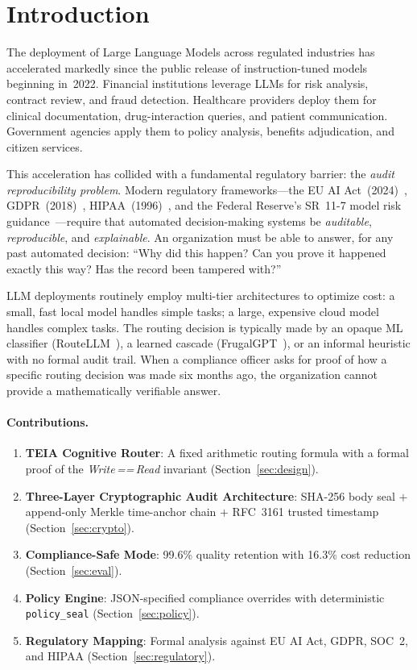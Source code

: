 \documentclass[11pt,a4paper]{article}
\newcommand{\teia}{\textsc{TEIA}}
\newcommand{\wwr}{\emph{Write\,==\,Read}}
\begin{document}
\tableofcontents
\newpage

\section{Introduction}

The deployment of Large Language Models across regulated industries has accelerated
markedly since the public release of instruction-tuned models beginning in~2022.
Financial institutions leverage LLMs for risk analysis, contract review, and fraud
detection. Healthcare providers deploy them for clinical documentation,
drug-interaction queries, and patient communication. Government agencies apply them
to policy analysis, benefits adjudication, and citizen services.

This acceleration has collided with a fundamental regulatory barrier: the
\emph{audit reproducibility problem}. Modern regulatory frameworks---the EU AI
Act~(2024)~\cite{euaiact}, GDPR~(2018)~\cite{gdpr}, HIPAA~(1996)~\cite{hipaa},
and the Federal Reserve's SR~11-7 model risk guidance~\cite{sr117}---require that
automated decision-making systems be \emph{auditable}, \emph{reproducible}, and
\emph{explainable}. An organization must be able to answer, for any past automated
decision: ``Why did this happen? Can you prove it happened exactly this way? Has
the record been tampered with?''

LLM deployments routinely employ multi-tier architectures to optimize cost: a
small, fast local model handles simple tasks; a large, expensive cloud model handles
complex tasks. The routing decision is typically made by an opaque ML classifier
(RouteLLM~\cite{routellm}), a learned cascade (FrugalGPT~\cite{frugalgpt}), or an
informal heuristic with no formal audit trail. When a compliance officer asks for
proof of how a specific routing decision was made six months ago, the organization
cannot provide a mathematically verifiable answer.

\paragraph{Contributions.}
\begin{enumerate}
  \item \textbf{\teia{} Cognitive Router}: A fixed arithmetic routing formula with
    a formal proof of the \wwr{} invariant (Section~\ref{sec:design}).
  \item \textbf{Three-Layer Cryptographic Audit Architecture}: SHA-256 body seal
    $+$ append-only Merkle time-anchor chain $+$ RFC~3161 trusted timestamp
    (Section~\ref{sec:crypto}).
  \item \textbf{Compliance-Safe Mode}: 99.6\% quality retention with 16.3\% cost
    reduction (Section~\ref{sec:eval}).
  \item \textbf{Policy Engine}: JSON-specified compliance overrides with
    deterministic \texttt{policy\_seal} (Section~\ref{sec:policy}).
  \item \textbf{Regulatory Mapping}: Formal analysis against EU AI Act, GDPR,
    SOC~2, and HIPAA (Section~\ref{sec:regulatory}).
\end{enumerate}
\end{document}
